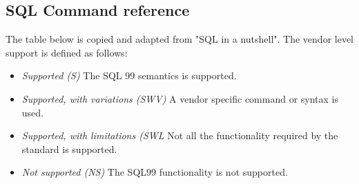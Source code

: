 \documentclass[10pt,twocolumn,fleqn]{article}
\begin{document}
\subsection{SQL Command reference}
The table below is copied and adapted from "SQL in a nutshell".
The vendor level support is defined as follows:
\begin{itemize}
\item {\em Supported (S)} The SQL 99 semantics is supported.
\item {\em Supported, with variations (SWV)} A vendor specific command or syntax is used.
\item {\em Supported, with limitations (SWL} Not all the functionality required by the standard is supported.
\item {\em Not supported (NS)} The SQL99 functionality is not supported.
\end{itemize}
\end{document}
